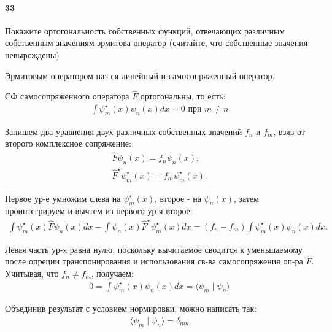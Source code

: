 


	\paragraph{33}
	Покажите ортогональность собственных функций, отвечающих различным собственным значениям эрмитова оператор (считайте, что собственные значения невырождены)\\
	
	\begin{definition}
		Эрмитовым оператором наз-ся линейный и самосопряженный оператор.
	\end{definition}
	
	СФ самосопряженного оператора $\hat F$ ортогональны, то есть:
	\begin{gather*}
	\int \psi^{\star}_m(x) \psi_n(x)dx = 0\text{ при }m\ne n
	\end{gather*}
	
	Запишем два уравнения двух различных собственных значений $f_n$ и $f_m$, взяв от второго комплексное сопряжение:
	\begin{gather*}
	\hat{F}\psi_n(x)=f_n\psi_n(x),\\
	\hat{F}^\star \psi^\star_m(x)=f_m\psi^\star_m(x).
	\end{gather*}
	
	Первое ур-е умножим слева на $\psi^\star_m(x)$, второе - на $\psi_n(x)$, затем проинтегрируем и вычтем из первого ур-я второе:
	\begin{gather*}
	\int \psi^\star_m(x)\hat{F}\psi_n(x)dx - 
	\int \psi_n(x)\hat{F}^\star \psi^\star_m(x)dx=
	(f_n-f_m)\int \psi^\star_m(x)\psi_n(x)dx.
	\end{gather*}
	
	Левая часть ур-я равна нулю, поскольку вычитаемое сводится к уменьшаемому после опреции транспонирования и использования св-ва самосопряжения оп-ра $\hat{F}$. Учитывая, что $f_n\ne f_m$, получаем:
	\begin{gather*}
	0=\int \psi^\star_m(x)\psi_n(x)dx=
	\langle\psi_m\mid\psi_n\rangle
	\end{gather*}
	
	Объединив результат с условием нормировки, можно написать так:
	\begin{gather*}
	\langle\psi_m\mid\psi_n\rangle=\delta_{mn}
	\end{gather*}
